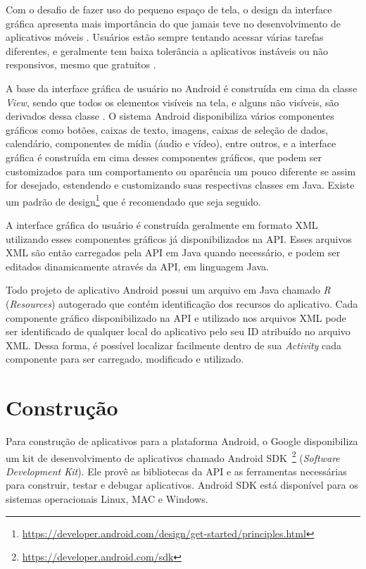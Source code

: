 \begin{apendicesenv}
Com o desafio de fazer uso do pequeno espaço de tela, o design da interface gráfica apresenta mais importância do que jamais teve no desenvolvimento de aplicativos móveis \cite{eswissues}. Usuários estão sempre tentando acessar várias tarefas diferentes, e geralmente tem baixa tolerância a aplicativos instáveis ou não responsivos, mesmo que gratuitos \cite{eswmobile}. 

A base da interface gráfica de usuário no Android é construída em cima da classe \textit{View}, sendo que todos os elementos visíveis na tela, e alguns não visíveis, são derivados dessa classe \cite{androidarch2010}. O sistema Android disponibiliza vários componentes gráficos como botões, caixas de texto, imagens, caixas de seleção de dados, calendário, componentes de mídia (áudio e vídeo), entre outros, e a interface gráfica é construída em cima desses componentes gráficos, que podem ser customizados para um comportamento ou aparência um pouco diferente se assim for desejado, estendendo e customizando suas respectivas classes em Java. Existe um padrão de design\footnote{\url{https://developer.android.com/design/get-started/principles.html}} que é recomendado que seja seguido.

A interface gráfica do usuário é construída geralmente em formato XML utilizando esses componentes gráficos já disponibilizados na API. Esses arquivos XML são então carregados pela API em Java quando necessário, e podem ser editados dinamicamente através da API, em linguagem Java.

Todo projeto de aplicativo Android possui um arquivo em Java chamado \textit{R} (\textit{Resources}) autogerado que contém identificação dos recursos do aplicativo. Cada componente gráfico disponibilizado na API e utilizado nos arquivos XML pode ser identificado de qualquer local do aplicativo pelo seu ID atribuído no arquivo XML. Dessa forma, é possível localizar facilmente dentro de sua \textit{Activity} cada componente para ser carregado, modificado e utilizado.

\section{Construção}

Para construção de aplicativos para a plataforma Android, o Google disponibiliza um kit de desenvolvimento de aplicativos chamado Android SDK~\footnote{\url{https://developer.android.com/sdk}} (\textit{Software Development Kit}). Ele provê as bibliotecas da API e as ferramentas necessárias para construir, testar e debugar aplicativos. Android SDK está disponível para os sistemas operacionais Linux, MAC e Windows.


\end{apendicesenv}
